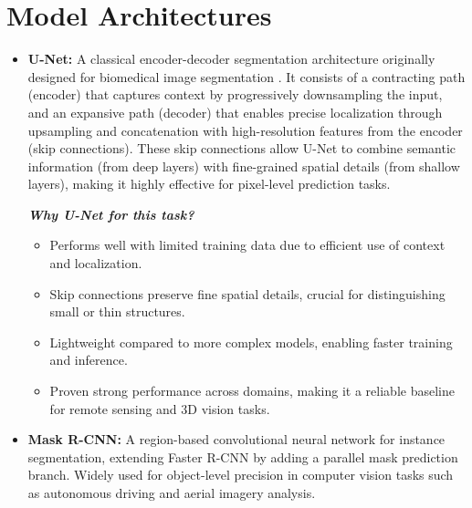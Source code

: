 \documentclass[rnd]{mas_proposal}
\begin{document}
\section{Model Architectures}
\begin{itemize}
    \item \textbf{U-Net:} A classical encoder-decoder segmentation architecture originally designed for biomedical image segmentation \cite{unet}. 
    It consists of a contracting path (encoder) that captures context by progressively downsampling the input, 
    and an expansive path (decoder) that enables precise localization through upsampling and concatenation with 
    high-resolution features from the encoder (skip connections). These skip connections allow U-Net to 
    combine semantic information (from deep layers) with fine-grained spatial details (from shallow layers), 
    making it highly effective for pixel-level prediction tasks. 

    \textit{\textbf{Why U-Net for this task?}}  
    \begin{itemize}
        \item Performs well with limited training data due to efficient use of context and localization. 
        \item Skip connections preserve fine spatial details, crucial for distinguishing small or thin structures. 
        \item Lightweight compared to more complex models, enabling faster training and inference. 
        \item Proven strong performance across domains, making it a reliable baseline for remote sensing and 3D vision tasks. 
    \end{itemize}

    \item \textbf{Mask R-CNN:} A region-based convolutional neural network for instance segmentation, 
    extending Faster R-CNN by adding a parallel mask prediction branch. 
    Widely used for object-level precision in computer vision tasks such as autonomous driving and aerial imagery analysis.  

\end{itemize}
\end{document}
